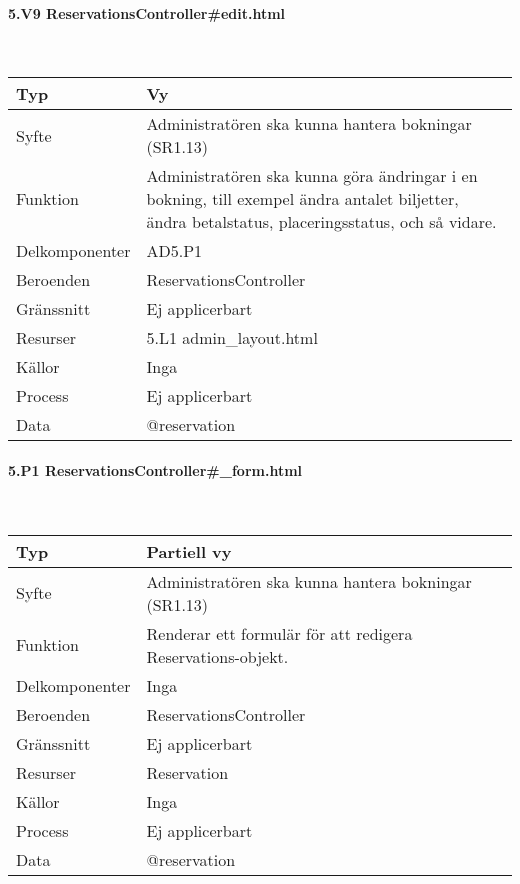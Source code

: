 \documentclass[a4paper, twoside, 11pt, titlepage]{article}
\begin{document}
			\paragraph{5.V9 ReservationsController\#edit.html}\

			\begin {table} [ht] \begin{tabular} {  p{3.5cm} p{9.6cm} }
				\hline
				{Typ} & {Vy} \\
				\hline
				{Syfte} & {Administratören ska kunna hantera bokningar (SR1.13)} \\
				\hline
				{Funktion} & {Administratören ska kunna göra ändringar i en bokning, till exempel ändra antalet biljetter, ändra betalstatus, placeringsstatus, och så vidare.} \\
				\hline
				{Delkomponenter} & {AD5.P1} \\
				\hline
				{Beroenden} & {ReservationsController} \\
				\hline
				{Gränssnitt} & {Ej applicerbart} \\
				\hline
				{Resurser} & {5.L1 admin\_layout.html} \\
				\hline
				{Källor} & {Inga} \\
				\hline
				{Process} & {Ej applicerbart} \\
				\hline
				{Data} & {@reservation} \\
				\hline
			\end{tabular} \end{table} \FloatBarrier


			\paragraph{5.P1 ReservationsController\#\_form.html}\

			\begin {table} [ht] \begin{tabular} {  p{3.5cm} p{9.6cm} }
				\hline
				{Typ} & {Partiell vy} \\
				\hline
				{Syfte} & {Administratören ska kunna hantera bokningar (SR1.13)} \\
				\hline
				{Funktion} & {Renderar ett formulär för att redigera Reservations-objekt.} \\
				\hline
				{Delkomponenter} & {Inga} \\
				\hline
				{Beroenden} & {ReservationsController} \\
				\hline
				{Gränssnitt} & {Ej applicerbart} \\
				\hline
				{Resurser} & {Reservation} \\
				\hline
				{Källor} & {Inga} \\
				\hline
				{Process} & {Ej applicerbart} \\
				\hline
				{Data} & {@reservation} \\
				\hline
			\end{tabular} \end{table} \FloatBarrier
\end{document}
